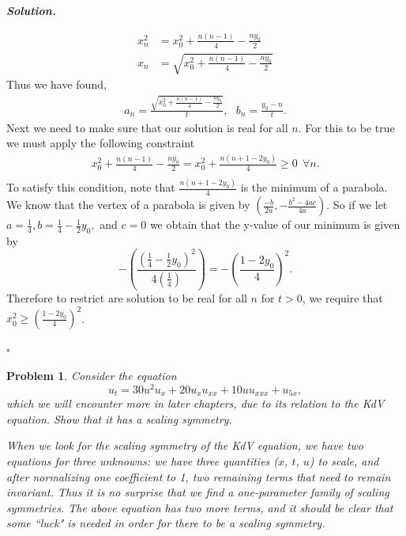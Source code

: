 \documentclass[12pt]{report}
\newtheorem{problem}{Problem}
\newenvironment{solution}[1][\it{Solution}]{\textbf{#1. } }{$\square$}
\newcommand{\paren}[1]{{\left(#1\right)}} %
\begin{document}
\begin{solution}
\begin{enumerate}
\begin{align*}
            x_n^2 &= x_0^2 + \frac{n(n-1)}{4} - \frac{ny_0}{2}\\
            x_n &= \sqrt{x_0^2 + \frac{n(n-1)}{4} - \frac{ny_0}{2}}
        \end{align*}
        Thus we have found,
        \begin{align*}
            a_n = \frac{\sqrt{x_0^2 + \frac{n(n-1)}{4} - \frac{ny_0}{2}}}{t}, ~~~ b_n = \frac{y_0 - n}{t}.
        \end{align*}
        Next we need to make sure that our solution is real for all $n$. For this to be true we must apply the following constraint
        \begin{align*}
            x_0^2 + \frac{n(n-1)}{4} - \frac{ny_0}{2} = x_0^2 + \frac{n(n+1-2y_0)}{4} \geq 0 ~~ \forall n.\\
        \end{align*}
        To satisfy this condition, note that $\frac{n(n+1-2y_0)}{4}$ is the minimum of a parabola. We know that the vertex of a parabola is given by $(\frac{-b}{2a}, -\frac{b^2-4ac}{4a})$. So if we let $a = \frac{1}{4}, b = \frac{1}{4} - \frac{1}{2}y_0,$ and $c=0$ we obtain that the y-value of our minimum is given by
        \[
            - \paren{\frac{(\frac{1}{4} - \frac{1}{2}y_0)^2}{4(\frac{1}{4})}} = -\paren{\frac{1-2y_0}{4}}^2.
        \]
        Therefore to restrict are solution to be real for all $n$ for $t > 0$, we require that $x_0^2 \geq \paren{\frac{1-2y_0}{4}}^2$.

    \end{enumerate}
\end{solution}

\newpage



\begin{problem}
    Consider the equation
\[
u_t=30u^2 u_x+20u_x u_{xx}+10 u u_{xxx}+u_{5x},
\]
which we will encounter more in later chapters, due to its relation to the KdV equation. Show that it has a scaling symmetry.

When we look for the scaling symmetry of the KdV equation, we have two equations for three unknowns: we have three quantities ($x$, $t$, $u$) to scale, and after normalizing one coefficient to 1, two remaining terms that need to remain invariant. Thus it is no surprise that we find a one-parameter family of scaling symmetries. The above equation has two more terms, and it should be clear that some ``luck" is needed in order for there to be a scaling symmetry.

\end{problem}
\end{document}
